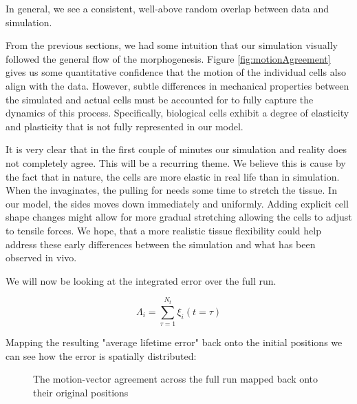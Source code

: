 
In general, we see a consistent, well-above random overlap between data and simulation. 

From the previous sections, we had some intuition that our simulation visually followed the general flow of the morphogenesis. Figure \ref{fig:motionAgreement} gives us some quantitative confidence that the motion of the individual cells also align with the data. However, subtle differences in mechanical properties between the simulated and actual cells must be accounted for to fully capture the dynamics of this process. Specifically, biological cells exhibit a degree of elasticity and plasticity that is not fully represented in our model.

It is very clear that in the first couple of minutes our simulation and reality does not completely agree. This will be a recurring theme. We believe this is cause by the fact that in nature, the cells are more elastic in real life than in simulation. When the  invaginates, the pulling for needs some time to stretch the tissue. In our model, the sides moves down immediately and uniformly. Adding explicit cell shape changes might allow for more gradual stretching allowing the cells to adjust to tensile forces. We hope, that a more realistic tissue flexibility could help address these early differences between the simulation and what has been observed in vivo.


We will now be looking at the integrated error over the full run.

\begin{equation}
     \Lambda_i = \sum_{\tau = 1}^{N_t}\xi_i(t=\tau)
\end{equation}

Mapping the resulting "average lifetime error" back onto the initial positions we can see how the error is spatially distributed:
\begin{figure}[H]
    \centering
    \caption{The motion-vector agreement across the full run mapped back onto their original positions }
    \label{fig:}
\end{figure}

